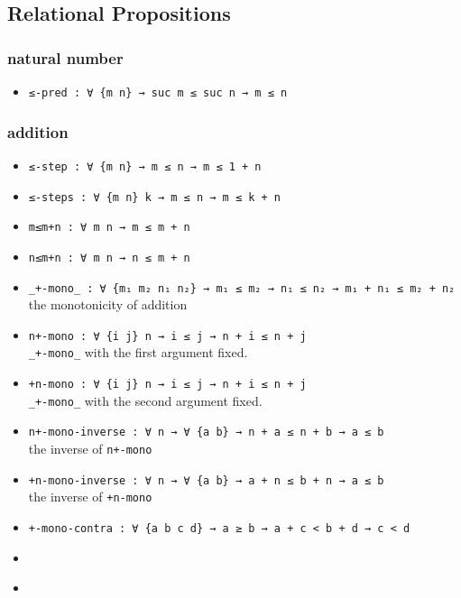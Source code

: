 \documentclass[../thesis.tex]{subfiles}
\begin{document}
\subsection{Relational Propositions}

\subsubsection{natural number}

\begin{itemize}
    \item {\lstinline|≤-pred : ∀ {m n} → suc m ≤ suc n → m ≤ n|}
\end{itemize}

\subsubsection{addition}

\begin{itemize}
    \item {\lstinline|≤-step : ∀ {m n} → m ≤ n → m ≤ 1 + n|}
    \item {\lstinline|≤-steps : ∀ {m n} k → m ≤ n → m ≤ k + n|}
    \item {\lstinline|m≤m+n : ∀ m n → m ≤ m + n|}
    \item {\lstinline|n≤m+n : ∀ m n → n ≤ m + n|}
    \item {\lstinline|_+-mono_ : ∀ {m₁ m₂ n₁ n₂} → m₁ ≤ m₂ → n₁ ≤ n₂ → m₁ + n₁ ≤ m₂ + n₂|}
        \\ the monotonicity of addition
    \item {\lstinline|n+-mono : ∀ {i j} n → i ≤ j → n + i ≤ n + j|}
        \\ {\lstinline|_+-mono_|} with the first argument fixed.
    \item {\lstinline|+n-mono : ∀ {i j} n → i ≤ j → n + i ≤ n + j|}
        \\ {\lstinline|_+-mono_|} with the second argument fixed.
    \item {\lstinline|n+-mono-inverse : ∀ n → ∀ {a b} → n + a ≤ n + b → a ≤ b|}
        \\ the inverse of {\lstinline|n+-mono|}
    \item {\lstinline|+n-mono-inverse : ∀ n → ∀ {a b} → a + n ≤ b + n → a ≤ b|}
        \\ the inverse of {\lstinline|+n-mono|}
    \item {\lstinline|+-mono-contra : ∀ {a b c d} → a ≥ b → a + c < b + d → c < d|}
    \item {\lstinline||}
    \item {\lstinline||}
\end{itemize}

%
%
\end{document}
